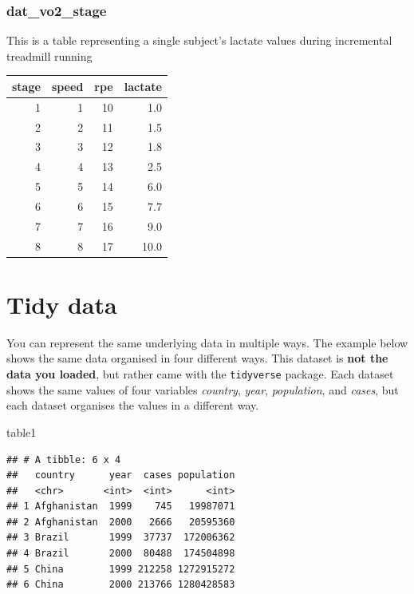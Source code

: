 \documentclass[
]{book}
\newenvironment{Shaded}{\begin{snugshade}}{\end{snugshade}}
\newcommand{\NormalTok}[1]{#1}
\begin{document}
\hypertarget{dat_vo2_stage}{%
\subsubsection{dat\_vo2\_stage}\label{dat_vo2_stage}}

This is a table representing a single subject's lactate values during incremental treadmill running

\begin{tabular}{r|r|r|r}
\hline
stage & speed & rpe & lactate\\
\hline
1 & 1 & 10 & 1.0\\
\hline
2 & 2 & 11 & 1.5\\
\hline
3 & 3 & 12 & 1.8\\
\hline
4 & 4 & 13 & 2.5\\
\hline
5 & 5 & 14 & 6.0\\
\hline
6 & 6 & 15 & 7.7\\
\hline
7 & 7 & 16 & 9.0\\
\hline
8 & 8 & 17 & 10.0\\
\hline
\end{tabular}

\hypertarget{WRANGLE-TIDY-DATA}{%
\section{Tidy data}\label{WRANGLE-TIDY-DATA}}

You can represent the same underlying data in multiple ways. The example below shows the same data organised in four different ways. This dataset is \textbf{not the data you loaded}, but rather came with the \texttt{tidyverse} package. Each dataset shows the same values of four variables \emph{country}, \emph{year}, \emph{population}, and \emph{cases}, but each dataset organises the values in a different way.

\begin{Shaded}
\begin{Highlighting}[]
\NormalTok{table1}
\end{Highlighting}
\end{Shaded}

\begin{verbatim}
## # A tibble: 6 x 4
##   country      year  cases population
##   <chr>       <int>  <int>      <int>
## 1 Afghanistan  1999    745   19987071
## 2 Afghanistan  2000   2666   20595360
## 3 Brazil       1999  37737  172006362
## 4 Brazil       2000  80488  174504898
## 5 China        1999 212258 1272915272
## 6 China        2000 213766 1280428583
\end{verbatim}
\end{document}
